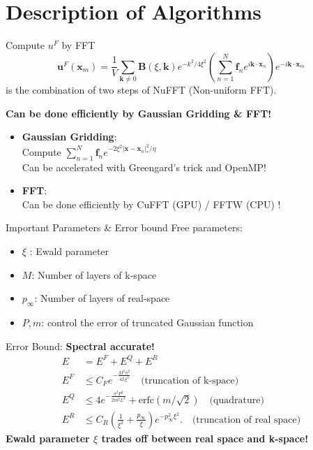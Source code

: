 \documentclass{beamer}
\begin{document}
\section{Description of Algorithms}

\begin{frame}{Compute $u^F$ by FFT}
\begin{equation}
\mathbf{u}^F (\mathbf{x}_m) = \frac{1}{V} \sum_{\mathbf{k} \neq 0} \mathbf{B}(\xi, \mathbf{k}) e^{-k^2/4\xi^2} \left(\sum_{n=1}^{N} \mathbf{f}_n e ^{i \mathbf{k} \cdot \mathbf{x}_n} \right)e ^{-i \mathbf{k} \cdot \mathbf{x}_m}
\end{equation}
is the combination of two steps of NuFFT (Non-uniform FFT).

\textbf{Can be done efficiently by Gaussian Gridding \& FFT!}
\begin{itemize}
	\item \textbf{Gaussian Gridding}: \\
	Compute $ \sum_{n=1}^N \mathbf{f}_n e^{-2 \xi^2 |\mathbf{x} - \mathbf{x}_n|_{\ast}^2 / \eta}$ \\
	Can be accelerated with Greengard's trick \cite{Greengard2004} and  OpenMP!
	\item \textbf{FFT}: \\
	Can be done efficiently by CuFFT (GPU) / FFTW (CPU) !
\end{itemize}
\end{frame}

\begin{frame}{Important Parameters \& Error bound}
Free parameters:
\begin{itemize}
	\item $\xi$ : Ewald parameter
	\item $M$: Number of layers of k-space
	\item $p_{\infty}$: Number of layers of real-space
	\item $P, m$: control the error of truncated Gaussian function
\end{itemize}
Error Bound: \textbf{Spectral accurate!}
\begin{align}
E & = E^F + E^Q + E^R \\
E^F & \le C_F e^{-\frac{M^2 \pi^2}{4 L \xi^2}} \quad  \text{(truncation of k-space)}\\
E^Q & \le  4 e^{- \frac{\pi^2 P^2}{2 m^2 L^2}} + \text{erfc} (m / \sqrt{2}) \quad  \text{(quadrature)}\\
E^R & \le C_R (\frac{1}{\xi^2} + \frac{p_{\infty}}{\xi}) e^{-p_{\infty}^2 \xi^2}. \quad \text{(truncation of real space)}
\end{align}
\textbf{Ewald parameter $\xi$ trades off between real space and k-space!}
\end{frame}
\end{document}
